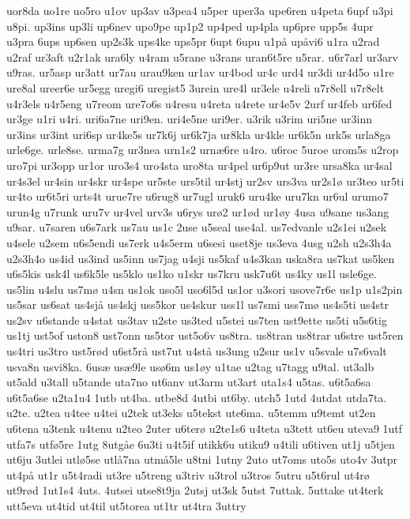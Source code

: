 uor8da
uo1re
uo5ro
u1ov
up3av
u3pea4
u5per
uper3a
upe6ren
u4peta
6upf
u3pi
u8pi.
up3ins
up3li
up6nev
upo9pe
up1p2
up4ped
up4pla
up6pre
upp5s
4upr
u3pra
6ups
up6sen
up2s3k
ups4ke
ups5pr
6upt
6upu
u1p^^e5
up^^e5vi6
u1ra
u2rad
u2raf
ur3aft
u2r1ak
ura6ly
u4ram
u5rane
u3rans
uran6t5re
u5rar.
u6r7arl
ur3arv
u9ras.
ur5asp
ur3att
ur7au
urau9ken
ur1av
ur4bod
ur4c
urd4
ur3di
ur4d5o
u1re
ure8al
ureer6e
ur5egg
uregi6
uregist5
3urein
ure4l
ur3ele
u4reli
u7r8ell
u7r8elt
u4r3els
u4r5eng
u7reom
ure7o6s
u4resu
u4reta
u4rete
ur4e5v
2urf
ur4feb
ur6fed
ur3ge
u1ri
u4ri.
uri6a7ne
uri9en.
uri4e5ne
uri9er.
u3rik
u3rim
uri5ne
ur3inn
ur3ins
ur3int
uri6sp
ur4ke5s
ur7k6j
ur6k7ja
ur8kla
ur4kle
ur6k5n
urk5s
urla8ga
urle6ge.
urle8se.
urma7g
ur3nea
urn1s2
urn^^e66re
u4ro.
u6roc
5uroe
urom5s
u2rop
uro7pi
ur3opp
ur1or
uro3s4
uro4sta
uro8ta
ur4pel
ur6p9ut
ur3re
ursa8ka
ur4sal
ur4s3el
ur4sin
ur4skr
ur4spe
ur5ste
urs5til
ur4stj
ur2sv
urs3va
ur2s1^^f8
ur3teo
ur5ti
ur4to
ur6t5ri
urts4t
urue7re
u6rug8
ur7ugl
uruk6
uru4ke
uru7kn
ur6ul
urumo7
urun4g
u7runk
uru7v
ur4vel
urv3s
u6rys
ur^^f82
ur1^^f8d
ur1^^f8y
4usa
u9sane
us3ang
u9sar.
u7saren
u6s7ark
us7au
us1c
2use
u5seal
use4al.
us7edvanle
u2s1ei
u2sek
u4sele
u2sem
u6s5endi
us7erk
u4s5erm
u6sesi
uset8je
us3eva
4usg
u2sh
u2s3h4a
u2s3h4o
us4id
us3ind
us5inn
us7jag
u4sji
us5kaf
u4s3kan
uska8ra
us7kat
us5ken
u6s5kis
usk4l
us6k5le
us5klo
us1ko
u1skr
us7kru
usk7u6t
us4ky
us1l
usle6ge.
us5lin
u4slu
us7m^^f8
u4sn
us1ok
uso5l
uso6l5d
us1or
u3sori
usove7r6e
us1p
u1s2pin
us5sar
us6sat
us4sj^^e5
us4skj
uss5kor
us4skur
uss1l
us7smi
uss7m^^f8
us4s5ti
us4str
us2sv
u6stande
u4stat
us3tav
u2ste
us3ted
u5stei
us7ten
ust9ette
us5ti
u5s6tig
us1tj
ust5of
uston8
ust7onn
us5tor
ust5o6v
us8tra.
us8tran
us8trar
u6stre
ust5ren
us4tri
us3tro
ust5r^^f8d
u6st5r^^e5
ust7ut
u4st^^e5
us3ung
u2sur
us1v
u5svale
u7s6valt
usva8n
usvi8ka.
6us^^e6
us^^e69le
us^^f86m
us1^^f8y
u1tae
u2tag
u7tagg
u9tal.
ut3alb
ut5ald
u3tall
u5tande
uta7no
ut6anv
ut3arm
ut3art
uta1s4
u5tas.
u6t5a6sa
u6t5a6se
u2ta1u4
1utb
ut4ba.
utbe8d
4utbi
ut6by.
utch5
1utd
4utdat
utda7ta.
u2te.
u2tea
u4tee
u4tei
u2tek
ut3eks
u5tekst
ute6ma.
u5temm
u9temt
ut2en
u6tena
u3tenk
u4tenu
u2teo
2uter
u6ter^^f8
u2te1s6
u4teta
u3tett
ut6eu
uteva9
1utf
utfa7s
utf^^f85re
1utg
8utg^^e5e
6u3ti
u4t5if
utikk6u
utiku9
u4tili
u6tiven
ut1j
u5tjen
ut6ju
3utlei
utl^^f85se
utl^^e57na
utm^^e55le
u8tni
1utny
2uto
ut7oms
uto5s
uto4v
3utpr
ut4p^^e5
ut1r
u5t4radi
ut3re
u5treng
u3triv
u3trol
u3tros
5utru
u5t6rul
ut4r^^f8
ut9r^^f8d
1ut1s4
4uts.
4utsei
utse8t9ja
2utsj
ut3sk
5utst
7uttak.
5uttake
ut4terk
utt5eva
ut4tid
ut4til
ut5torea
ut1tr
ut4tra
3uttry
